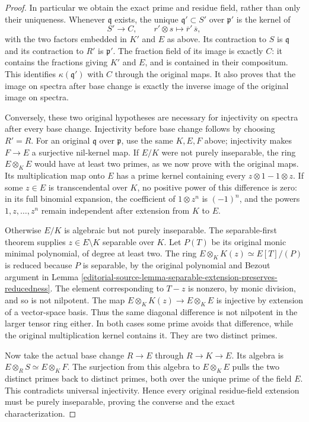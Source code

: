 \begin{proof}
In particular we obtain the exact
prime and residue field, rather
than only their uniqueness. Whenever
$\mathfrak q$ exists, the unique
$\mathfrak q'\subset S'$ over
$\mathfrak p'$ is the kernel of
$$
S'\longrightarrow C,\qquad
r'\otimes s\longmapsto
\overline r'\,\overline s,
$$
with the two factors embedded in
$K'$ and $E$ as above. Its contraction
to $S$ is $\mathfrak q$ and its
contraction to $R'$ is $\mathfrak p'$.
The fraction field of its image
is exactly $C$: it contains the
fractions giving $K'$ and $E$,
and is contained in their compositum.
This identifies $\kappa(\mathfrak q')$
with $C$ through the original maps.
It also proves that the image on
spectra after base change is exactly
the inverse image of the original
image on spectra.

Conversely, these two original
hypotheses are necessary for
injectivity on spectra after every
base change. Injectivity before
base change follows by choosing
$R'=R$. For an original
$\mathfrak q$ over $\mathfrak p$,
use the same $K,E,F$ above; injectivity
makes $F\to E$ a surjective nil-kernel
map. If $E/K$ were not purely
inseparable, the ring $E\otimes_K E$
would have at least two primes, as
we now prove with the original maps.
Its multiplication map onto $E$
has a prime kernel containing every
$z\otimes1-1\otimes z$.
If some $z\in E$ is transcendental
over $K$, no positive power of
this difference is zero: in its
full binomial expansion, the
coefficient of $1\otimes z^n$
is $(-1)^n$, and the powers
$1,z,\ldots,z^n$ remain independent
after extension from $K$ to $E$.

Otherwise $E/K$ is algebraic but
not purely inseparable. The
separable-first theorem supplies
$z\in E\setminus K$ separable over
$K$. Let $P(T)$ be its original
monic minimal polynomial, of degree
at least two. The ring
$E\otimes_K K(z)\simeq E[T]/(P)$
is reduced because $P$ is separable,
by the original polynomial and
Bezout argument in Lemma
\ref{editorial-source-lemma-separable-extension-preserves-reducedness}.
The element corresponding to $T-z$
is nonzero, by monic division,
and so is not nilpotent. The map
$E\otimes_K K(z)\to E\otimes_K E$
is injective by extension of a
vector-space basis. Thus the same
diagonal difference is not nilpotent
in the larger tensor ring either.
In both cases some prime avoids
that difference, while the original
multiplication kernel contains it.
They are two distinct primes.

Now take the actual base change
$R\to E$ through $R\to K\to E$.
Its algebra is
$E\otimes_R S\simeq E\otimes_K F$.
The surjection from this algebra
to $E\otimes_K E$ pulls the two
distinct primes back to distinct
primes, both over the unique prime
of the field $E$. This contradicts
universal injectivity. Hence every
original residue-field extension
must be purely inseparable, proving
the converse and the exact
characterization.
\end{proof}


